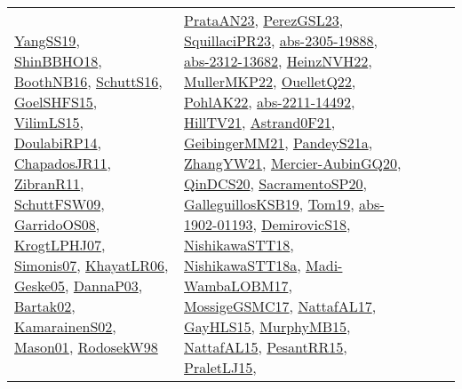 {\begin{longtable}{lp{3cm}>{\raggedright}p{6cm}>{\raggedright}p{6cm}p{8cm}}
\href{papers/YangSS19.pdf}{YangSS19}\cite{YangSS19}, \href{articles/ShinBBHO18.pdf}{ShinBBHO18}\cite{ShinBBHO18}, \href{papers/BoothNB16.pdf}{BoothNB16}\cite{BoothNB16}, \href{papers/SchuttS16.pdf}{SchuttS16}\cite{SchuttS16}, \href{articles/GoelSHFS15.pdf}{GoelSHFS15}\cite{GoelSHFS15}, \href{papers/VilimLS15.pdf}{VilimLS15}\cite{VilimLS15}, \href{papers/DoulabiRP14.pdf}{DoulabiRP14}\cite{DoulabiRP14}, \href{papers/ChapadosJR11.pdf}{ChapadosJR11}\cite{ChapadosJR11}, \href{papers/ZibranR11.pdf}{ZibranR11}\cite{ZibranR11}, \href{papers/SchuttFSW09.pdf}{SchuttFSW09}\cite{SchuttFSW09}, \href{articles/GarridoOS08.pdf}{GarridoOS08}\cite{GarridoOS08}, \href{papers/KrogtLPHJ07.pdf}{KrogtLPHJ07}\cite{KrogtLPHJ07}, \href{articles/Simonis07.pdf}{Simonis07}\cite{Simonis07}, \href{articles/KhayatLR06.pdf}{KhayatLR06}\cite{KhayatLR06}, \href{papers/Geske05.pdf}{Geske05}\cite{Geske05}, \href{papers/DannaP03.pdf}{DannaP03}\cite{DannaP03}, \href{papers/Bartak02.pdf}{Bartak02}\cite{Bartak02}, \href{papers/KamarainenS02.pdf}{KamarainenS02}\cite{KamarainenS02}, \href{articles/Mason01.pdf}{Mason01}\cite{Mason01}, \href{papers/RodosekW98.pdf}{RodosekW98}\cite{RodosekW98} & \href{articles/PrataAN23.pdf}{PrataAN23}\cite{PrataAN23}, \href{papers/PerezGSL23.pdf}{PerezGSL23}\cite{PerezGSL23}, \href{papers/SquillaciPR23.pdf}{SquillaciPR23}\cite{SquillaciPR23}, \href{articles/abs-2305-19888.pdf}{abs-2305-19888}\cite{abs-2305-19888}, \href{articles/abs-2312-13682.pdf}{abs-2312-13682}\cite{abs-2312-13682}, \href{articles/HeinzNVH22.pdf}{HeinzNVH22}\cite{HeinzNVH22}, \href{articles/MullerMKP22.pdf}{MullerMKP22}\cite{MullerMKP22}, \href{papers/OuelletQ22.pdf}{OuelletQ22}\cite{OuelletQ22}, \href{articles/PohlAK22.pdf}{PohlAK22}\cite{PohlAK22}, \href{articles/abs-2211-14492.pdf}{abs-2211-14492}\cite{abs-2211-14492}, \href{papers/HillTV21.pdf}{HillTV21}\cite{HillTV21}, \href{papers/Astrand0F21.pdf}{Astrand0F21}\cite{Astrand0F21}, \href{papers/GeibingerMM21.pdf}{GeibingerMM21}\cite{GeibingerMM21}, \href{articles/PandeyS21a.pdf}{PandeyS21a}\cite{PandeyS21a}, \href{articles/ZhangYW21.pdf}{ZhangYW21}\cite{ZhangYW21}, \href{papers/Mercier-AubinGQ20.pdf}{Mercier-AubinGQ20}\cite{Mercier-AubinGQ20}, \href{articles/QinDCS20.pdf}{QinDCS20}\cite{QinDCS20}, \href{articles/SacramentoSP20.pdf}{SacramentoSP20}\cite{SacramentoSP20}, \href{papers/GalleguillosKSB19.pdf}{GalleguillosKSB19}\cite{GalleguillosKSB19}, \href{papers/Tom19.pdf}{Tom19}\cite{Tom19}, \href{articles/abs-1902-01193.pdf}{abs-1902-01193}\cite{abs-1902-01193}, \href{papers/DemirovicS18.pdf}{DemirovicS18}\cite{DemirovicS18}, \href{papers/NishikawaSTT18.pdf}{NishikawaSTT18}\cite{NishikawaSTT18}, \href{papers/NishikawaSTT18a.pdf}{NishikawaSTT18a}\cite{NishikawaSTT18a}, \href{papers/Madi-WambaLOBM17.pdf}{Madi-WambaLOBM17}\cite{Madi-WambaLOBM17}, \href{papers/MossigeGSMC17.pdf}{MossigeGSMC17}\cite{MossigeGSMC17}, \href{articles/NattafAL17.pdf}{NattafAL17}\cite{NattafAL17}, \href{papers/GayHLS15.pdf}{GayHLS15}\cite{GayHLS15}, \href{papers/MurphyMB15.pdf}{MurphyMB15}\cite{MurphyMB15}, \href{articles/NattafAL15.pdf}{NattafAL15}\cite{NattafAL15}, \href{papers/PesantRR15.pdf}{PesantRR15}\cite{PesantRR15}, \href{papers/PraletLJ15.pdf}{PraletLJ15}\cite{PraletLJ15}, 
\end{longtable}}

